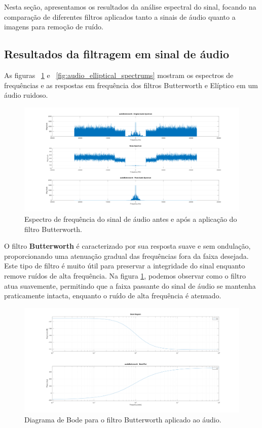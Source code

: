 Nesta seção, apresentamos os resultados da análise espectral do sinal, focando na comparação de diferentes filtros aplicados tanto a sinais de áudio quanto a imagens para remoção de ruído.

\subsection{Resultados da filtragem em sinal de áudio}
As figuras ~\ref{fig:audio_butterworth_spectrums} e ~\ref{fig:audio_elliptical_spectrums} mostram os espectros de frequências e as respostas em frequência dos filtros Butterworth e Elíptico em um áudio ruidoso.

\begin{figure}[H]
    \centering
    \includegraphics[width=1\linewidth]{03_results/assets/audio_butterworth_spectrums.png}
    \caption{Espectro de frequência do sinal de áudio antes e após a aplicação do filtro Butterworth.}
    \label{fig:audio_butterworth_spectrums}
\end{figure}

O filtro \textbf{Butterworth} é caracterizado por sua resposta suave e sem ondulação, proporcionando uma atenuação gradual das frequências fora da faixa desejada. Este tipo de filtro é muito útil para preservar a integridade do sinal enquanto remove ruídos de alta frequência. Na figura \ref{fig:audio_butterworth_spectrums}, podemos observar como o filtro atua suavemente, permitindo que a faixa passante do sinal de áudio se mantenha praticamente intacta, enquanto o ruído de alta frequência é atenuado.

\begin{figure}[H]
    \centering
    \includegraphics[width=1\linewidth]{03_results/assets/audio_butterworth_bode.png}
    \caption{Diagrama de Bode para o filtro Butterworth aplicado ao áudio.}
    \label{fig:audio_butterworth_bode}
\end{figure}

